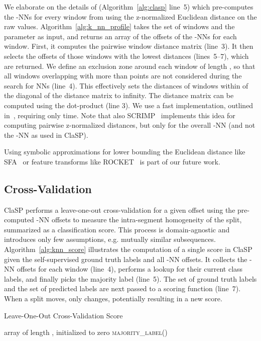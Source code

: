 \documentclass[pdflatex,sn-basic]{sn-jnl}
\begin{document}
We elaborate on the details of  (Algorithm~\ref{alg:clasp} line~5) which pre-computes the -NNs for every window from  using the z-normalized Euclidean distance on the raw values. Algorithm~\ref{alg:k_nn_profile} takes the set  of windows and the  parameter as input, and returns an array of the offsets of the -NNs for each window. First, it computes the pairwise window distance matrix (line~3). It then selects the offsets of those  windows with the lowest distances (lines~5--7), which are returned. We define an exclusion zone around each window of length , so that all windows overlapping with more than  points are not considered during the search for NNs (line~4). This effectively sets the distances of windows within  of the diagonal of the distance matrix to infinity.
The distance matrix can be computed using the dot-product (line 3). We use a fast implementation, outlined in~\citep{dokmanic2015euclidean, zhu2018matrix}, requiring only  time. Note that also SCRIMP~\citep{zhu2018matrix} implements this idea for computing pairwise z-normalized distances, but only for the overall -NN (and not the -NN as used in ClaSP).

Using symbolic approximations for lower bounding the Euclidean distance like SFA~\citep{SchaferH12} or feature transforms like ROCKET~\citep{dempster2020rocket} is part of our future work.


\subsection{Cross-Validation} \label{sec:crossval}

ClaSP performs a leave-one-out cross-validation for a given offset  using the pre-computed -NN offsets to measure the intra-segment homogeneity of the split, summarized as a classification score. This process is domain-agnostic and introduces only few assumptions, e.g. mutually similar subsequences. Algorithm~\ref{alg:knn_score} illustrates the computation of a single score in ClaSP given the self-supervised ground truth labels  and all -NN offsets. It collects the -NN offsets for each window (line~4), performs a lookup for their current class labels, and finally picks the majority label (line~5). The set of ground truth labels and the set of predicted labels are next passed to a scoring function (line~7). When a split moves, only  changes, potentially resulting in a new score.

\begin{algorithm}[t]
	\caption{Leave-One-Out Cross-Validation Score}\label{alg:knn_score}
	\begin{algorithmic}[1]
		
			\State  array of length , initialized to zero 
			\For{} 
		        \State  {}
				\State  \textsc{majority\_label}()
			\EndFor 
			\State \Return{}
		\EndProcedure
	\end{algorithmic}
\end{algorithm}
\end{document}
